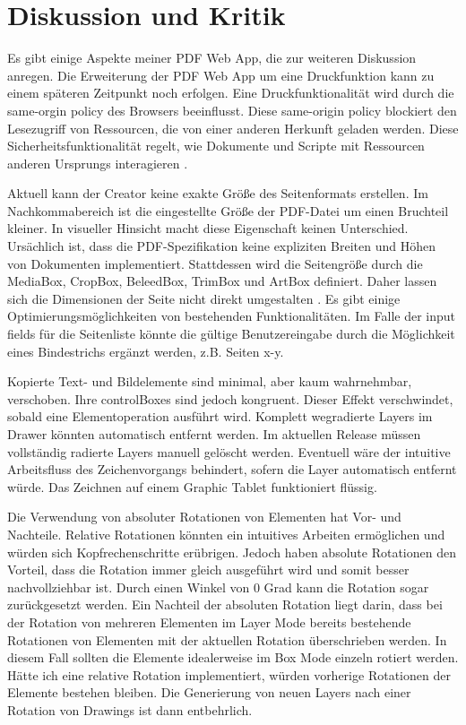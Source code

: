 \chapter{Diskussion und Kritik}
Es gibt einige Aspekte meiner PDF Web App, die zur weiteren Diskussion anregen. Die Erweiterung der PDF Web App um eine Druckfunktion kann zu einem späteren Zeitpunkt noch erfolgen. Eine Druckfunktionalität wird durch die same-orgin policy des Browsers beeinflusst. Diese same-origin policy blockiert den Lesezugriff von Ressourcen, die von einer anderen Herkunft geladen werden. Diese Sicherheitsfunktionalität regelt, wie Dokumente und Scripte mit Ressourcen anderen Ursprungs interagieren \cite{same-origin}. 
\par
Aktuell kann der Creator keine exakte Größe des Seitenformats erstellen. Im Nachkommabereich ist die eingestellte Größe der PDF-Datei um einen Bruchteil kleiner. In visueller Hinsicht macht diese Eigenschaft keinen Unterschied. Ursächlich ist, dass die PDF-Spezifikation keine expliziten Breiten und Höhen von Dokumenten implementiert. Stattdessen wird die Seitengröße durch die MediaBox, CropBox, BeleedBox, TrimBox und ArtBox definiert. Daher lassen sich die Dimensionen der Seite nicht direkt umgestalten \cite{pdf-lib-pagesize}. Es gibt einige Optimierungsmöglichkeiten von bestehenden Funktionalitäten. Im Falle der input fields für die Seitenliste könnte die gültige Benutzereingabe durch die Möglichkeit eines Bindestrichs ergänzt werden, z.B. Seiten x-y. 
\par
Kopierte Text- und Bildelemente sind minimal, aber kaum wahrnehmbar, verschoben. Ihre controlBoxes sind jedoch kongruent. Dieser Effekt verschwindet, sobald eine Elementoperation ausführt wird. Komplett wegradierte Layers im Drawer könnten automatisch entfernt werden. Im aktuellen Release müssen vollständig radierte Layers manuell gelöscht werden. Eventuell wäre der intuitive Arbeitsfluss des Zeichenvorgangs behindert, sofern die Layer automatisch entfernt würde. Das Zeichnen auf einem Graphic Tablet funktioniert flüssig. 
\par
Die Verwendung von absoluter Rotationen von Elementen hat Vor- und Nachteile. Relative Rotationen könnten ein intuitives Arbeiten ermöglichen und würden sich Kopfrechenschritte erübrigen. Jedoch haben absolute Rotationen den Vorteil, dass die Rotation immer gleich ausgeführt wird und somit besser nachvollziehbar ist. Durch einen Winkel von 0 Grad kann die Rotation sogar zurückgesetzt werden. Ein Nachteil der absoluten Rotation liegt darin, dass bei der Rotation von mehreren Elementen im Layer Mode bereits bestehende Rotationen von Elementen mit der aktuellen Rotation überschrieben werden. In diesem Fall sollten die Elemente idealerweise im Box Mode einzeln rotiert werden. Hätte ich eine relative Rotation implementiert, würden vorherige Rotationen der Elemente bestehen bleiben. Die Generierung von neuen Layers nach einer Rotation von Drawings ist dann entbehrlich. 
